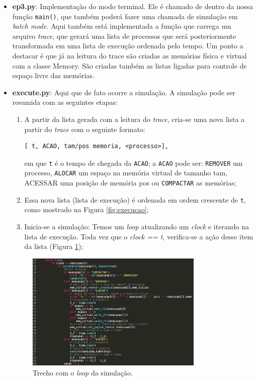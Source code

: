 \documentclass[12pt,a4paper]{article}
\begin{document}
\begin{itemize}
\item \textbf{ep3.py}: Implementação do modo terminal. Ele é chamado de dentro da nossa função \texttt{main()}, que também poderá fazer uma chamada de simulação em \textit{batch mode}. Aqui também está implementada a função que carrega um arquivo \textit{trace}, que gerará uma lista de processos que será posteriormente transformada em uma lista de execução ordenada pelo tempo. Um ponto a destacar é que já na leitura do trace são criadas as memórias física e virtual com a classe Memory. São criadas também as listas ligadas para controle de espaço livre das memórias.
\item \textbf{execute.py}: Aqui que de fato ocorre a simulação. A simulação pode ser resumida com as seguintes etapas:
\begin{enumerate}
\item A partir da lista gerada com a leitura do \textit{trace},  cria-se uma nova lista a partir do \textit{trace} com o seguinte formato:
\begin{center}
\begin{lstlisting}
[ t, ACAO, tam/pos memoria, <processo>],
\end{lstlisting}
\end{center}
em que \texttt{t} é o tempo de chegada da \texttt{ACAO}; a \texttt{ACAO} pode ser: \texttt{REMOVER} um processo, \texttt{ALOCAR} um espaço na memória virtual de tamanho \textsf{tam}, ACESSAR uma posição de memória  \textsf{pos} ou \texttt{COMPACTAR} as memórias;
\item Essa nova lista (lista de execução) é ordenada em ordem crescente de \texttt{t}, como mostrado na Figura \ref{fig:execucao};
\item Inicia-se a simulação: Temos um \textit{loop} atualizando um \textit{clock} e iterando na lista de execução. Toda vez que o \textit{clock == t}, verifica-se a ação desse item da lista (Figura \ref{fig:loop});  
\end{enumerate}

\begin{figure}[htpb]
\centering
\includegraphics[width=0.8\textwidth]{fig/loop_simula.png}
\caption{Trecho com o \textit{loop} da simulação.}
\label{fig:loop}
\end{figure}



\end{itemize}
\end{document}
